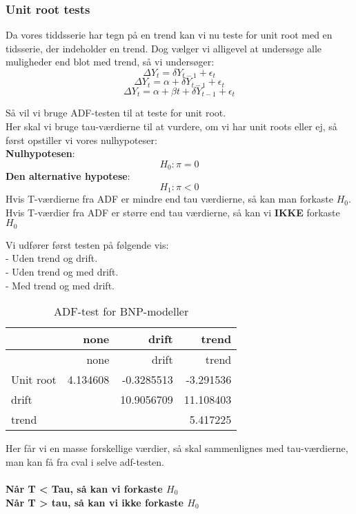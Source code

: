 \documentclass[
  10pt,
]{article}
\begin{document}
\newpage

\hypertarget{unit-root-tests}{%
\subsubsection{Unit root tests}\label{unit-root-tests}}

Da vores tiddsserie har tegn på en trend kan vi nu teste for unit root
med en tidsserie, der indeholder en trend. Dog vælger vi alligevel at
undersøge alle muligheder end blot med trend, så vi undersøger:\\
\[\Delta Y_t = \delta Y_{t-1}  + \epsilon_t \tag{No intercept, no trend}  \]
\[\Delta Y_t = \alpha +  \delta Y_{t-1}  + \epsilon_t \tag{Intercept, no trend}  \]
\[\Delta Y_t = \alpha+ \beta t + \delta Y_{t-1}  + \epsilon_t \tag{Intercept, trend}  \]

Så vil vi bruge ADF-testen til at teste for unit root.\\
Her skal vi bruge tau-værdierne til at vurdere, om vi har unit roots
eller ej, så først opstiller vi vores nulhypoteser:\\
\textbf{Nulhypotesen}:\\
\[H_0: \pi = 0 \tag{Unit root}  \] \textbf{Den alternative hypotese}:\\
\[H_1: \pi < 0 \tag{No unit root} \] Hvis T-værdierne fra ADF er mindre
end tau værdierne, så kan man forkaste \(H_0\).\\
Hvis T-værdier fra ADF er større end tau værdierne, så kan vi
\textbf{IKKE} forkaste \(H_0\)

Vi udfører først testen på følgende vis:\\
- Uden trend og drift.\\
- Uden trend og med drift.\\
- Med trend og med drift.\\

\begin{longtable}[]{@{}lrrr@{}}
\caption{ADF-test for BNP-modeller}\tabularnewline
\toprule
& none & drift & trend\tabularnewline
\midrule
\endfirsthead
\toprule
& none & drift & trend\tabularnewline
\midrule
\endhead
Unit root & 4.134608 & -0.3285513 & -3.291536\tabularnewline
drift & & 10.9056709 & 11.108403\tabularnewline
trend & & & 5.417225\tabularnewline
\bottomrule
\end{longtable}

Her får vi en masse forskellige værdier, så skal sammenlignes med
tau-værdierne, man kan få fra cval i selve adf-testen.\\
~\\
\textbf{Når T < Tau, så kan vi forkaste $H_0$}\\
\textbf{Når T > tau, så kan vi ikke forkaste $H_0$}
\end{document}
